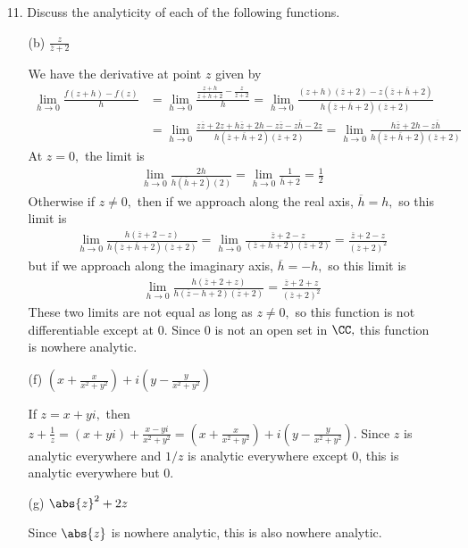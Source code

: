 \documentclass{article}
\begin{document}
\begin{itemize}
	\item[11.] Discuss the analyticity of each of the following functions.
		\begin{itemize}
			\item[(b)] $\frac{z}{\overline z+2}$
				\begin{soln}
					We have the derivative at point $z$ given by
					\begin{align*}
						\lim_{h\to 0}\frac{f(z+h)-f(z)}{h} &= \lim_{h\to 0} \frac{\frac{z+h}{\overline{z+h}+2} - \frac{z}{\overline z + 2}}{h} = \lim_{h\to 0} \frac{(z+h)(\overline z + 2) - z(\overline z+\overline h + 2)}{h(\overline z+\overline h + 2)(\overline z + 2)} \\
						&= \lim_{h\to 0} \frac{z\overline z + 2z +h\overline z + 2h - z\overline z - z\overline h - 2z}{h(\overline z + \overline h + 2)(\overline z + 2)} = \lim_{h\to 0} \frac{h\overline z + 2h - z\overline h}{h(\overline z + \overline h + 2)(\overline z + 2)}
					\end{align*}
					At $z=0,$ the limit is
					\begin{align*}
						\lim_{h\to 0} \frac{2h}{h(\overline h+2)(2)} = \lim_{h\to 0} \frac{1}{\overline h + 2} = \frac{1}{2}
					\end{align*}
					Otherwise if $z\neq 0,$ then if we approach along the real axis, $\overline h=h,$ so this limit is
					\begin{align*}
						\lim_{h\to 0} \frac{h(\overline z + 2 - z)}{h(\overline z + \overline h + 2)(\overline z + 2)} = \lim_{h\to 0} \frac{\overline z + 2 - z}{(\overline z + h + 2)(\overline z + 2)} = \frac{\overline z + 2 - z}{(\overline z+2)^2}
					\end{align*}
					but if we approach along the imaginary axis, $\overline h = -h,$ so this limit is
					\begin{align*}
						\lim_{h\to 0}\frac{h(\overline z + 2+ z)}{h(\overline z - h + 2)(\overline z + 2)} = \frac{\overline z + 2 + z}{(\overline z+2)^2}
					\end{align*}
					These two limits are not equal as long as $z\neq 0,$ so this function is not differentiable except at 0. Since 0 is not an open set in $\CC,$ this function is nowhere analytic.
				\end{soln}

			\item[(f)] $\left( x+\frac{x}{x^2+y^2} \right)+i\left( y-\frac{y}{x^2+y^2} \right)$
				\begin{soln}
					If $z=x+yi,$ then $ z+\frac{1}{z} = (x+yi) + \frac{x-yi}{x^2+y^2} = \left( x+\frac{x}{x^2+y^2} \right) + i\left( y-\frac{y}{x^2+y^2} \right).$ Since $z$ is analytic everywhere and $1/z$ is analytic everywhere except 0, this is analytic everywhere but 0.
				\end{soln}

			\item[(g)] $\abs{z}^2+2z$
				\begin{soln}
					Since $\abs{z}$ is nowhere analytic, this is also nowhere analytic.
				\end{soln}

		\end{itemize}

\end{itemize}
\end{document}
